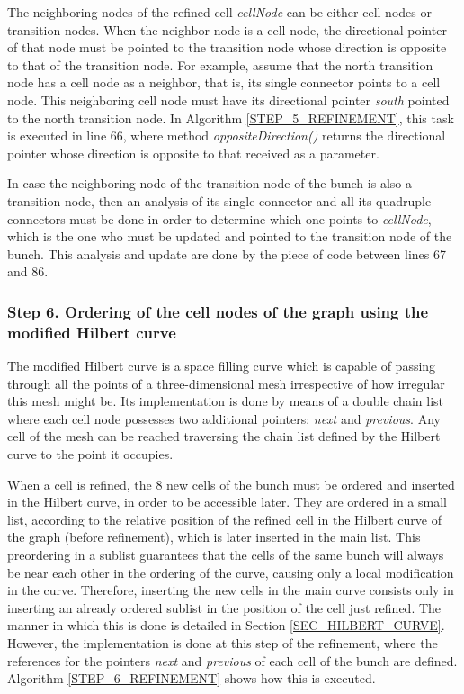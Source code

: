 The neighboring nodes of the refined cell \textit{cellNode} can be
either cell nodes or transition nodes. When the neighbor node is a
cell node, the directional pointer of that node must be pointed to
the transition node whose direction is opposite to that of the
transition node. For example, assume that the north transition node
has a cell node as a neighbor, that is, its single connector points
to a cell node. This neighboring cell node must have its directional
pointer \textit{south} pointed to the north transition node. In
Algorithm \ref{STEP_5_REFINEMENT}, this task is executed in line 66,
where method \textit{oppositeDirection()} returns the directional
pointer whose direction is opposite to that received as a parameter.

In case the neighboring node of the transition node of the bunch is
also a transition node, then an analysis of its single connector and
all its quadruple connectors must be done in order to determine
which one points to \textit{cellNode}, which is the one who must be
updated and pointed to the transition node of the bunch. This
analysis and update are done by the piece of code between lines 67
and 86.

\subsubsection*{Step 6. Ordering of the cell nodes of the graph using the modified Hilbert curve}
The modified Hilbert curve is a space filling curve which is capable
of passing through all the points of a three-dimensional mesh
irrespective of how irregular this mesh might be. Its implementation
is done by means of a double chain list where each cell node
possesses two additional pointers: \textit{next} and
\textit{previous}. Any cell of the mesh can be reached traversing
the chain list defined by the Hilbert curve to the point it
occupies.

When a cell is refined, the 8 new cells of the bunch must be ordered
and inserted in the Hilbert curve, in order to be accessible later.
They are ordered in a small list, according to the relative position
of the refined cell in the Hilbert curve of the graph (before
refinement), which is later inserted in the main list. This
preordering in a sublist guarantees that the cells of the same bunch
will always be near each other in the ordering of the curve, causing
only a local modification in the curve. Therefore, inserting the new
cells in the main curve consists only in inserting an already
ordered sublist in the position of the cell just refined. The manner
in which this is done is detailed in Section
\ref{SEC_HILBERT_CURVE}. However, the implementation is done at this
step of the refinement, where the references for the pointers
\textit{next} and \textit{previous} of each cell of the bunch are
defined. Algorithm \ref{STEP_6_REFINEMENT} shows how this is
executed.

